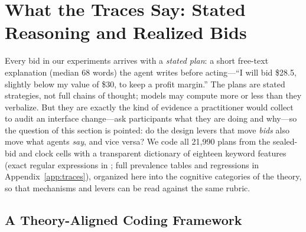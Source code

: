 
\section{What the Traces Say: Stated Reasoning and Realized Bids}\label{sec:traces}

Every bid in our experiments arrives with a \emph{stated plan}: a short free-text explanation (median 68 words) the agent writes before acting---``I will bid \$28.5, slightly below my value of \$30, to keep a profit margin.'' The plans are stated strategies, not full chains of thought; models may compute more or less than they verbalize. But they are exactly the kind of evidence a practitioner would collect to audit an interface change---ask participants what they are doing and why---so the question of this section is pointed: do the design levers that move \emph{bids} also move what agents \emph{say}, and vice versa? We code all 21{,}990 plans from the sealed-bid and clock cells with a transparent dictionary of eighteen keyword features (exact regular expressions in ; full prevalence tables and regressions in Appendix~\ref{app:traces}), organized here into the cognitive categories of the theory, so that mechanisms and levers can be read against the same rubric.

\subsection{A Theory-Aligned Coding Framework}\label{sec:traces-coding}


